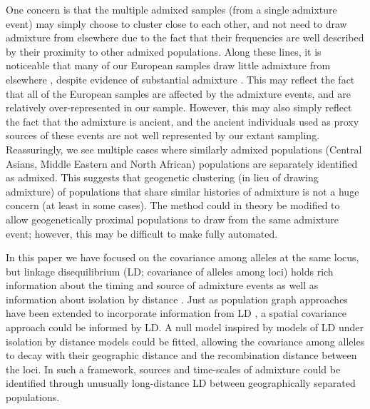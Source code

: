\documentclass[12pt]{article}
\begin{document}
One concern is that the multiple admixed samples (from a single admixture event) may simply choose to cluster close to each other, 
and not need to draw admixture from elsewhere due to the fact that their frequencies are well described by their proximity to other admixed populations.  
Along these lines, it is noticeable that many of our European samples draw little admixture from elsewhere \citep[a fact also noted by][ using a different approach]{Hellenthal}, 
despite evidence of substantial admixture \citep{lazaridis_ancient_2014}.
This may reflect the fact that all of the European samples are affected by the admixture events, and are relatively over-represented in our sample. 
However, this may also simply reflect the fact that the admixture is ancient, 
and the ancient individuals used as proxy sources of these events are not well represented by our extant sampling. 
Reassuringly, we see multiple cases where similarly admixed populations (Central Asians, Middle Eastern and North African) 
populations are separately identified as admixed. 
This suggests that geogenetic clustering (in lieu of drawing admixture) of populations that share similar histories of admixture is not a huge concern 
(at least in some cases). 
The method could in theory be modified to allow geogenetically proximal populations to draw from the same admixture event;
however, this may be difficult to make fully automated.



In this paper we have focused on the covariance among alleles at the same locus, 
but linkage disequilibrium (LD; covariance of alleles among loci) 
holds rich information about the timing and source of admixture events \citep[e.g.][]{chakraborty_admixture_1988,moorjani_india_2013, Hellenthal,gravel_population_2012} 
as well as information about isolation by distance \citep{ralph2013geography}.
Just as population graph approaches have been extended to incorporate information from LD \citep{Loh:13}, 
a spatial covariance approach could be informed by LD. 
A null model inspired by models of LD under isolation by distance models \citep{Arkendra2007,Barton2013} could be fitted, 
allowing the covariance among alleles to decay with their geographic distance and the recombination distance between the loci. 
In such a framework, sources and time-scales of admixture could be identified through unusually long-distance LD between geographically separated populations. 
\end{document}
